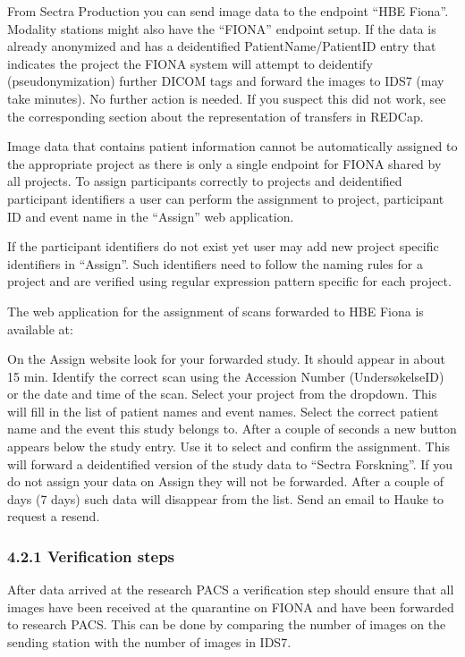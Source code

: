 \documentclass[letterpaper,10pt,english]{sphinxmanual}
\begin{document}
\sphinxAtStartPar
From Sectra Production you can send image data to the endpoint “HBE Fiona”. Modality stations might also have the “FIONA” endpoint setup. If the data is already anonymized and has a de\sphinxhyphen{}identified PatientName/PatientID entry that indicates the project the FIONA system will attempt to de\sphinxhyphen{}identify (pseudonymization) further DICOM tags and forward the images to IDS7 (may take minutes). No further action is needed. If you suspect this did not work, see the corresponding section about the representation of transfers in REDCap.

\sphinxAtStartPar
Image data that contains patient information cannot be automatically assigned to the appropriate project as there is only a single endpoint for FIONA shared by all projects. To assign participants correctly to projects and de\sphinxhyphen{}identified participant identifiers a user can perform the assignment to project, participant ID and event name in the “Assign” web application.

\sphinxAtStartPar
If the participant identifiers do not exist yet user may add new project specific identifiers in “Assign”. Such identifiers need to follow the naming rules for a project and are verified using regular expression pattern specific for each project.

\sphinxAtStartPar
The web application for the assignment of scans forwarded to HBE Fiona is available at:

\sphinxAtStartPar
On the Assign website look for your forwarded study. It should appear in about 15 min.
Identify the correct scan using the Accession Number (Undersøkelse\sphinxhyphen{}ID) or the date and time
of the scan. Select your project from the drop\sphinxhyphen{}down. This will fill in the list of patient names
and event names. Select the correct patient name and the event this study belongs to. After
a couple of seconds a new button appears below the study entry. Use it to select and
confirm the assignment. This will forward a de\sphinxhyphen{}identified version of the study data to “Sectra
Forskning”. If you do not assign your data on Assign they will not be forwarded. After a
couple of days (7 days) such data will disappear from the list. Send an email to Hauke to request
a resend.


\subsubsection{4.2.1 Verification steps}
\label{\detokenize{EndUser/end-user:verification-steps}}
\sphinxAtStartPar
After data arrived at the research PACS a verification step should ensure that all images have been received at the quarantine on FIONA and have been forwarded to research PACS. This can be done by comparing the number of images on the sending station with the number of images in IDS7.
\end{document}
